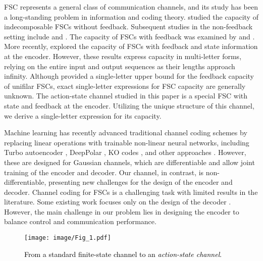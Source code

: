 FSC represents a general class of communication channels, and its study has been a long-standing problem in information and coding theory. \textcolor{black}{\cite{blackwell1958proof}} studied the capacity of indecomposable FSCs without feedback. Subsequent studies in the non-feedback setting include \cite{Verdu1994} and \cite{Goldsmith1996}. The capacity of FSCs with feedback was examined by \cite{massey1990causality} and \cite{haim2007}. More recently, \cite{shemuel2022finite} explored the capacity of FSCs with feedback and state information at the encoder. However, these results express capacity in multi-letter forms, relying on the entire input and output sequences as their lengths approach infinity.
Although \cite{haim2017} provided a single-letter upper bound for the feedback capacity of unifilar FSCs, exact single-letter expressions for FSC capacity are generally unknown. The action-state channel studied in this paper is a special FSC with state and feedback at the encoder. Utilizing the unique structure of this channel, we derive a single-letter expression for its capacity.

Machine learning has recently advanced traditional channel coding schemes by replacing linear operations with trainable non-linear neural networks, including Turbo autoencoder \citep{jiang2019turbo}, DeepPolar \citep{hebbar2024deeppolar}, KO codes \citep{makkuva2021ko}, and other approaches \citep{jiang2020learn,kim2018deepcode}.
However, these are designed for Gaussian channels, which are differentiable and allow joint training of the encoder and decoder. Our channel, in contrast, is non-differentiable, presenting new challenges for the design of the encoder and decoder. Channel coding for FSCs is a challenging task with limited results in the literature. Some existing work focuses only on the design of the decoder \citep{aharoni2023data}. However, the main challenge in our problem lies in designing the encoder to balance control and communication performance.


\begin{figure}[t]
    \centering
    \texttt{[image: image/Fig\_1.pdf]}
     \caption{\small\textcolor{black}{{From a standard finite-state channel to an \textit{action-state channel}.}}}
     \label{FSC_fig_1}
     \vspace{-10pt}
\end{figure}

